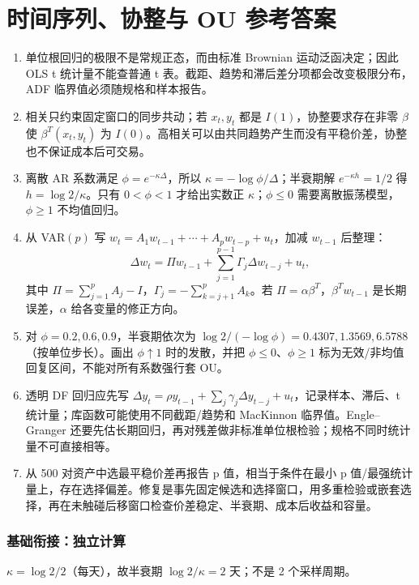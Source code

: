 \chapter{时间序列、协整与 OU 参考答案}

\begin{enumerate}[leftmargin=*]
  \item 单位根回归的极限不是常规正态，而由标准 Brownian 运动泛函决定；因此 OLS t 统计量不能查普通 t 表。截距、趋势和滞后差分项都会改变极限分布，ADF 临界值必须随规格和样本报告。
  \item 相关只约束固定窗口的同步共动；若 $x_t,y_t$ 都是 $I(1)$，协整要求存在非零 $\beta$ 使 $\beta^T(x_t,y_t)$ 为 $I(0)$。高相关可以由共同趋势产生而没有平稳价差，协整也不保证成本后可交易。
  \item 离散 AR 系数满足 $\phi=e^{-\kappa\Delta}$，所以 $\kappa=-\log\phi/\Delta$；半衰期解 $e^{-\kappa h}=1/2$ 得 $h=\log2/\kappa$。只有 $0<\phi<1$ 才给出实数正 $\kappa$；$\phi\le0$ 需要离散振荡模型，$\phi\ge1$ 不均值回归。
  \item 从 VAR$(p)$ 写 $w_t=A_1w_{t-1}+\cdots+A_pw_{t-p}+u_t$，加减 $w_{t-1}$ 后整理：
  \[
  \Delta w_t=\Pi w_{t-1}+\sum_{j=1}^{p-1}\Gamma_j\Delta w_{t-j}+u_t,
  \]
  其中 $\Pi=\sum_{j=1}^pA_j-I$，$\Gamma_j=-\sum_{k=j+1}^pA_k$。若 $\Pi=\alpha\beta^T$，$\beta^Tw_{t-1}$ 是长期误差，$\alpha$ 给各变量的修正方向。
  \item 对 $\phi=0.2,0.6,0.9$，半衰期依次为 $\log2/(-\log\phi)=0.4307,1.3569,6.5788$（按单位步长）。画出 $\phi\uparrow1$ 时的发散，并把 $\phi\le0$、$\phi\ge1$ 标为无效/非均值回复区间，不能对所有系数强行套 OU。
  \item 透明 DF 回归应先写 $\Delta y_t=\rho y_{t-1}+\sum_j\gamma_j\Delta y_{t-j}+u_t$，记录样本、滞后、t 统计量；库函数可能使用不同截距/趋势和 MacKinnon 临界值。Engle--Granger 还要先估长期回归，再对残差做非标准单位根检验；规格不同时统计量不可直接相等。
  \item 从 500 对资产中选最平稳价差再报告 p 值，相当于条件在最小 p 值/最强统计量上，存在选择偏差。修复是事先固定候选和选择窗口，用多重检验或嵌套选择，再在未触碰后移窗口检查价差稳定、半衰期、成本后收益和容量。
\end{enumerate}

\subsection*{基础衔接：独立计算}
$\kappa=\log2/2$（每天），故半衰期 $\log2/\kappa=2$ 天；不是 2 个采样周期。

